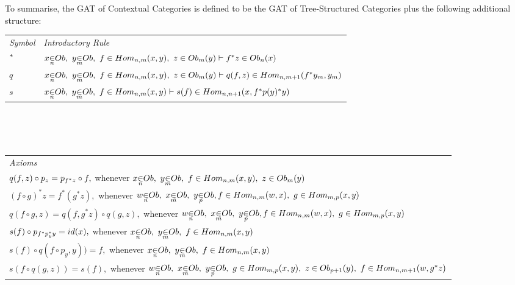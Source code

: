 \documentclass[10pt,a4paper]{scrartcl}
\begin{document}
\noindent To summarise, the GAT of Contextual Categories is defined to be the GAT of Tree-Structured Categories plus
the following additional structure: \\
\vspace{0.1cm} 
\begin{tabular}{>{\itshape}l l}
Symbol & \itshape{Introductory Rule} \\[0.1cm]
$^* $&$ \ofObi{x}{n} ,\  \ofObi{y}{m} ,\  \ofHomij{f}{n}{m}{x}{y} ,\  \ofT{z}{\Obi{m}(y)}
\tstyle \ofT {f \sub z}{\Obi{n}(x) } $\\[0.25cm]
$ q  $&$ \ofObi{x}{n} ,\  \ofObi{y}{m} ,\  \ofHomij{f}{n}{m}{x}{y} ,\  \ofT{z}{\Obi{m}(y)}
\tstyle
                     \ofT{q(f,z)}{  \Homij{n}{m+1}(f\sub y_m  , y_m ) }$  \\ [0.25cm]
$ s  $ & $ \ofObi{x}{n} ,\  \ofObi{y}{m} ,\  \ofHomij{f}{n}{m}{x}{y} \tstyle
                 \ofT{s(f)} {\Homij{n}{n+1}(x,f \sub p (y)  \sub y)} $ \\ [0.25cm]


\end{tabular} \\
\vspace{.1cm}  \\
\vspace{.03cm} \\
\begin{tabular}{l}
\itshape{Axioms} \\
$q(f,z) \circ p_z =p_{f^* z} \circ f,$ 
          whenever $\ofObi{x}{n} ,\  \ofObi{y}{m} ,\  \ofHomij{f}{n}{m}{x}{y} ,\  \ofT{z}{\Obi{m}(y)} $\\  [0.25cm]
					

$(f \circ g)^*z =  f^* (g ^* z), $
          whenever  $ \ofObi{w}{n} ,\ \ofObi{x}{m} ,\ \ofObi{y}{p}, 
					\ofHomij{f}{n}{m}{w}{x} ,\  \ofHomij{g}{m}{p}{x}{y}    $ \\[0.25cm]

$q(f \circ g,z) = q(f,g^*z) \circ q(g,z), $
				   whenever  $ \ofObi{w}{n} ,\ \ofObi{x}{m} ,\ \ofObi{y}{p}, 
					\ofHomij{f}{n}{m}{w}{x} ,\  \ofHomij{g}{m}{p}{x}{y}    $ \\[0.25cm]
					
$s(f) \circ p_{f ^* p_y ^* y} = id(x),$ 
          whenever $\ofObi{x}{n} ,\  \ofObi{y}{m} ,\  \ofHomij{f}{n}{m}{x}{y} $ \\ [0.25cm]
				
$s(f) \circ q( f \circ p_y    ,y))=f, $	
          whenever	$ \ofObi{x}{n} ,\  \ofObi{y}{m} ,\  \ofHomij{f}{n}{m}{x}{y} $ \\ [0.25cm]		
					
$s(f \circ q(g,z))=s(f),$ 
          whenever $\ofObi{w}{n} ,\  \ofObi{x}{m}  ,\   \ofObi{y}{p} ,\    \ofHomij{g}{m}{p}{x}{y} ,\ \ofT{z}{\Obi{p+1}(y)} ,\ \ofHomij{f}{n}{m+1}{w}{g \sub z} $ \\ [0.25cm]				
					
\end{tabular}  \\
\end{document}
